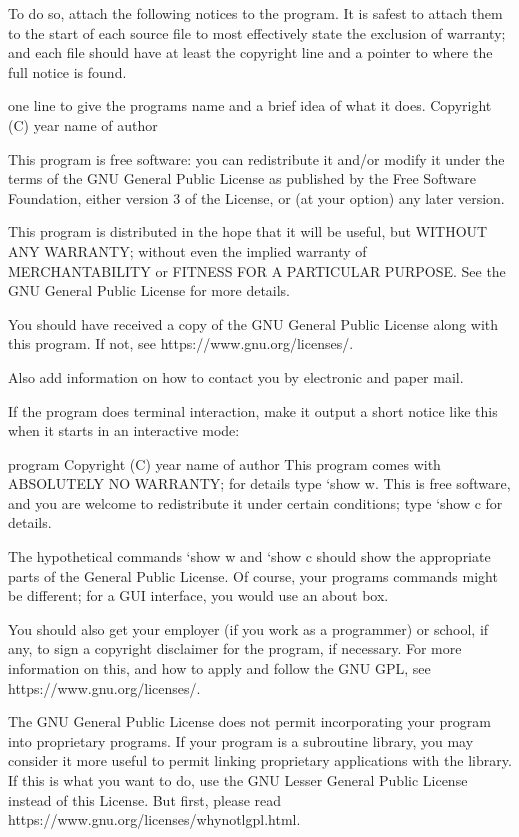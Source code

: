 \documentclass[a4paper,10pt,english]{sphinxmanual}
\begin{document}
\begin{sphinxVerbatim}[commandchars=\\\{\}]
  To do so, attach the following notices to the program.  It is safest
to attach them to the start of each source file to most effectively
state the exclusion of warranty; and each file should have at least
the \PYGZdq{}copyright\PYGZdq{} line and a pointer to where the full notice is found.

    \PYGZlt{}one line to give the program\PYGZsq{}s name and a brief idea of what it does.\PYGZgt{}
    Copyright (C) \PYGZlt{}year\PYGZgt{}  \PYGZlt{}name of author\PYGZgt{}

    This program is free software: you can redistribute it and/or modify
    it under the terms of the GNU General Public License as published by
    the Free Software Foundation, either version 3 of the License, or
    (at your option) any later version.

    This program is distributed in the hope that it will be useful,
    but WITHOUT ANY WARRANTY; without even the implied warranty of
    MERCHANTABILITY or FITNESS FOR A PARTICULAR PURPOSE.  See the
    GNU General Public License for more details.

    You should have received a copy of the GNU General Public License
    along with this program.  If not, see \PYGZlt{}https://www.gnu.org/licenses/\PYGZgt{}.

Also add information on how to contact you by electronic and paper mail.

  If the program does terminal interaction, make it output a short
notice like this when it starts in an interactive mode:

    \PYGZlt{}program\PYGZgt{}  Copyright (C) \PYGZlt{}year\PYGZgt{}  \PYGZlt{}name of author\PYGZgt{}
    This program comes with ABSOLUTELY NO WARRANTY; for details type `show w\PYGZsq{}.
    This is free software, and you are welcome to redistribute it
    under certain conditions; type `show c\PYGZsq{} for details.

The hypothetical commands `show w\PYGZsq{} and `show c\PYGZsq{} should show the appropriate
parts of the General Public License.  Of course, your program\PYGZsq{}s commands
might be different; for a GUI interface, you would use an \PYGZdq{}about box\PYGZdq{}.

  You should also get your employer (if you work as a programmer) or school,
if any, to sign a \PYGZdq{}copyright disclaimer\PYGZdq{} for the program, if necessary.
For more information on this, and how to apply and follow the GNU GPL, see
\PYGZlt{}https://www.gnu.org/licenses/\PYGZgt{}.

  The GNU General Public License does not permit incorporating your program
into proprietary programs.  If your program is a subroutine library, you
may consider it more useful to permit linking proprietary applications with
the library.  If this is what you want to do, use the GNU Lesser General
Public License instead of this License.  But first, please read
\PYGZlt{}https://www.gnu.org/licenses/why\PYGZhy{}not\PYGZhy{}lgpl.html\PYGZgt{}.
\end{sphinxVerbatim}
\end{document}
